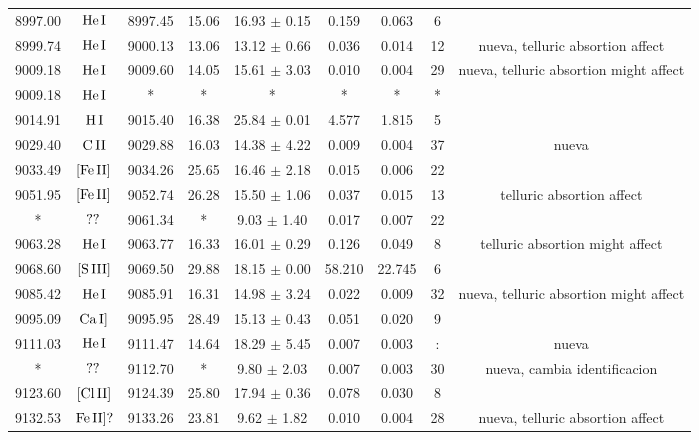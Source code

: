 \documentclass{article}
\begin{document}
\begin{table*}
\begin{adjustbox}{width=\textwidth}
\begin{tabular}{ccccccccc}
8997.00 & $\mbox{He}\thinspace \mbox{I}$ & 8997.45 & 15.06 & 16.93 $\pm$ 0.15 & 0.159 & 0.063 & 6 &  \\
8999.74 & $\mbox{He}\thinspace \mbox{I}$ & 9000.13 & 13.06 & 13.12 $\pm$ 0.66 & 0.036 & 0.014 & 12 &  nueva, telluric absortion affect \\
9009.18 & $\mbox{He}\thinspace \mbox{I}$ & 9009.60 & 14.05 & 15.61 $\pm$ 3.03 & 0.010 & 0.004 & 29 &  nueva, telluric absortion might affect \\
9009.18 & $\mbox{He}\thinspace \mbox{I}$ & * & * & * & * & * & * &  \\
9014.91 & $\mbox{H}\thinspace \mbox{I}$ & 9015.40 & 16.38 & 25.84 $\pm$ 0.01 & 4.577 & 1.815 & 5 &  \\
9029.40 & $\mbox{C}\thinspace \mbox{II}$ & 9029.88 & 16.03 & 14.38 $\pm$ 4.22 & 0.009 & 0.004 & 37 &  nueva \\
9033.49 & $\mbox{[Fe}\thinspace \mbox{II]}$ & 9034.26 & 25.65 & 16.46 $\pm$ 2.18 & 0.015 & 0.006 & 22 &  \\
9051.95 & $\mbox{[Fe}\thinspace \mbox{II]}$ & 9052.74 & 26.28 & 15.50 $\pm$ 1.06 & 0.037 & 0.015 & 13 &  telluric absortion affect \\
* & $\mbox{??}\thinspace \mbox{}$ & 9061.34 & * & 9.03 $\pm$ 1.40 & 0.017 & 0.007 & 22 &  \\
9063.28 & $\mbox{He}\thinspace \mbox{I}$ & 9063.77 & 16.33 & 16.01 $\pm$ 0.29 & 0.126 & 0.049 & 8 &  telluric absortion might affect \\
9068.60 & $\mbox{[S}\thinspace \mbox{III]}$ & 9069.50 & 29.88 & 18.15 $\pm$ 0.00 & 58.210 & 22.745 & 6 &  \\
9085.42 & $\mbox{He}\thinspace \mbox{I}$ & 9085.91 & 16.31 & 14.98 $\pm$ 3.24 & 0.022 & 0.009 & 32 &  nueva, telluric absortion might affect \\
9095.09 & $\mbox{Ca}\thinspace \mbox{I]}$ & 9095.95 & 28.49 & 15.13 $\pm$ 0.43 & 0.051 & 0.020 & 9 &  \\
9111.03 & $\mbox{He}\thinspace \mbox{I}$ & 9111.47 & 14.64 & 18.29 $\pm$ 5.45 & 0.007 & 0.003 & : &  nueva \\
* & $\mbox{??}\thinspace \mbox{}$ & 9112.70 & * & 9.80 $\pm$ 2.03 & 0.007 & 0.003 & 30 &  nueva, cambia identificacion \\
9123.60 & $\mbox{[Cl}\thinspace \mbox{II]}$ & 9124.39 & 25.80 & 17.94 $\pm$ 0.36 & 0.078 & 0.030 & 8 &  \\
9132.53 & $\mbox{Fe}\thinspace \mbox{II]?}$ & 9133.26 & 23.81 & 9.62 $\pm$ 1.82 & 0.010 & 0.004 & 28 &  nueva, telluric absortion affect \\

\end{tabular}
\end{adjustbox}
\end{table*}
\end{document}

